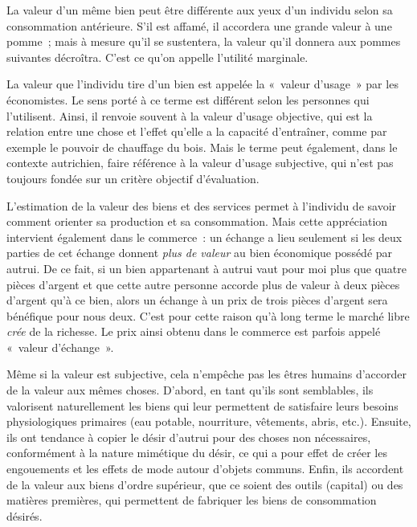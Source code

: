 La valeur d'un même bien peut être différente aux yeux d'un individu selon sa consommation antérieure. S'il est affamé, il accordera une grande valeur à une pomme~; mais à mesure qu'il se sustentera, la valeur qu'il donnera aux pommes suivantes décroîtra. C'est ce qu'on appelle l'utilité marginale.

La valeur que l'individu tire d'un bien est appelée la «~valeur d'usage~» par les économistes. Le sens porté à ce terme est différent selon les personnes qui l'utilisent. Ainsi, il renvoie souvent à la valeur d'usage objective, qui est la relation entre une chose et l'effet qu'elle a la capacité d'entraîner, comme par exemple le pouvoir de chauffage du bois. Mais le terme peut également, dans le contexte autrichien, faire référence à la valeur d'usage subjective, qui n'est pas toujours fondée sur un critère objectif d'évaluation.

L'estimation de la valeur des biens et des services permet à l'individu de savoir comment orienter sa production et sa consommation. Mais cette appréciation intervient également dans le commerce~: un échange a lieu seulement si les deux parties de cet échange donnent \emph{plus de valeur} au bien économique possédé par autrui. De ce fait, si un bien appartenant à autrui vaut pour moi plus que quatre pièces d'argent et que cette autre personne accorde plus de valeur à deux pièces d'argent qu'à ce bien, alors un échange à un prix de trois pièces d'argent sera bénéfique pour nous deux. C'est pour cette raison qu'à long terme le marché libre \emph{crée} de la richesse. Le prix ainsi obtenu dans le commerce est parfois appelé «~valeur d'échange~».

Même si la valeur est subjective, cela n'empêche pas les êtres humains d'accorder de la valeur aux mêmes choses. D'abord, en tant qu'ils sont semblables, ils valorisent naturellement les biens qui leur permettent de satisfaire leurs besoins physiologiques primaires (eau potable, nourriture, vêtements, abris, etc.). Ensuite, ils ont tendance à copier le désir d'autrui pour des choses non nécessaires, conformément à la nature mimétique du désir, ce qui a pour effet de créer les engouements et les effets de mode autour d'objets communs. Enfin, ils accordent de la valeur aux biens d'ordre supérieur, que ce soient des outils (capital) ou des matières premières, qui permettent de fabriquer les biens de consommation désirés.

